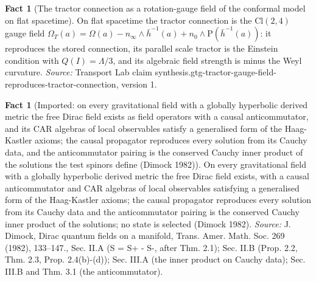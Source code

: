 \documentclass[11pt]{article}
\theoremstyle{definition}
\newtheorem{fact}[theorem]{Fact}
\theoremstyle{plain}
\providecommand{\Cl}{}\renewcommand{\Cl}{\mathrm{Cl}}
\providecommand{\Sch}{}\renewcommand{\Sch}{\mathrm{P}}
\providecommand{\hb}{}\renewcommand{\hb}{\bar{h}}
\providecommand{\nInf}{}\renewcommand{\nInf}{n_\infty}
\providecommand{\nO}{}\renewcommand{\nO}{n_0}
\begin{document}
\begin{fact}[The tractor connection as a rotation-gauge field of the conformal model on flat spacetime]\label{c:synthesis.gtg-tractor-gauge-field-reproduces-tractor-connection}
On flat spacetime the tractor connection is the $\Cl(2,4)$ gauge field $\Omega_{T}(a) = \Omega(a) - \nInf \wedge \hb^{-1}(a) + \nO \wedge \Sch(\hb^{-1}(a))$: it reproduces the stored connection, its parallel scale tractor is the Einstein condition with $Q(I) = \Lambda/3$, and its algebraic field strength is minus the Weyl curvature.
\emph{Source:} Transport Lab claim synthesis.gtg-tractor-gauge-field-reproduces-tractor-connection, version 1.
\end{fact}

\begin{fact}[Imported: on every gravitational field with a globally hyperbolic derived metric the free Dirac field exists as field operators with a causal anticommutator, and its CAR algebras of local observables satisfy a generalised form of the Haag-Kastler axioms; the causal propagator reproduces every solution from its Cauchy data, and the anticommutator pairing is the conserved Cauchy inner product of the solutions the test spinors define (Dimock 1982)]\label{c:synthesis.imported-dimock-dirac-car-algebra-on-a-gravitational-field}
On every gravitational field with a globally hyperbolic derived metric the free Dirac field exists, with a causal anticommutator and CAR algebras of local observables satisfying a generalised form of the Haag-Kastler axioms; the causal propagator reproduces every solution from its Cauchy data and the anticommutator pairing is the conserved Cauchy inner product of the solutions; no state is selected (Dimock 1982).
\emph{Source:} J. Dimock, Dirac quantum fields on a manifold, Trans. Amer. Math. Soc. 269 (1982), 133--147., Sec. II.A (S = S+ - S-, after Thm. 2.1); Sec. II.B (Prop. 2.2, Thm. 2.3, Prop. 2.4(b)-(d)); Sec. III.A (the inner product on Cauchy data); Sec. III.B and Thm. 3.1 (the anticommutator).
\end{fact}
\end{document}
